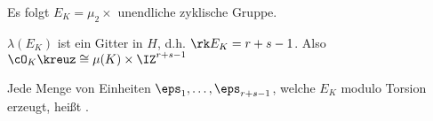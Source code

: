 \begin{Bemerkung}
 Es folgt $E_K=\mu_2 \times$ unendliche zyklische Gruppe.
\end{Bemerkung}

\begin{Satz}
 $\lambda(E_K)$ ist ein Gitter in $H$, d.h. $\rk E_K=r+s-1$. Also $\cO_K\kreuz \cong \mu(K)\times\IZ^{r+s-1}$
\end{Satz}

\begin{Definition}
 Jede Menge von Einheiten $\eps_1,\ldots,\eps_{r+s-1}$, welche $E_K$ modulo Torsion erzeugt, heißt .
\end{Definition}





